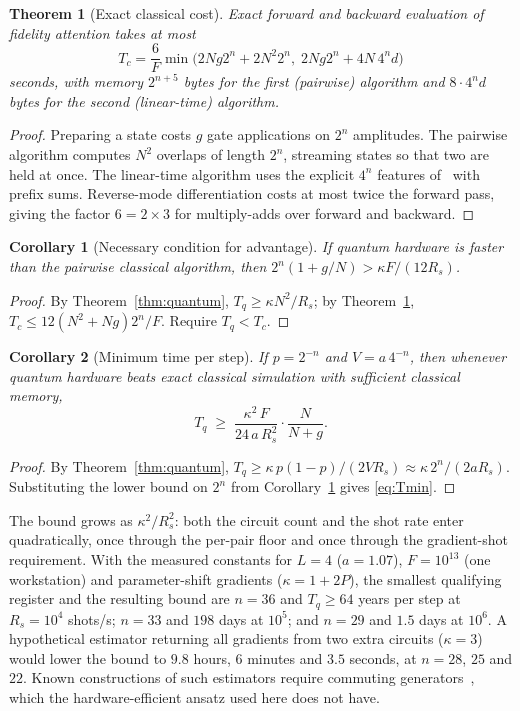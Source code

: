 \documentclass[conference]{IEEEtran}
\newtheorem{theorem}{Theorem}
\newtheorem{corollary}{Corollary}
\theoremstyle{definition}
\begin{document}
\begin{theorem}[Exact classical cost]\label{thm:classical}
Exact forward and backward evaluation of fidelity attention takes at most
\begin{equation}
T_c=\frac{6}{F}\min\!\big(2Ng2^n+2N^2 2^n,\;2Ng2^n+4N\,4^n d\big)
\label{eq:Tc}
\end{equation}
seconds, with memory $2^{n+5}$ bytes for the first (pairwise) algorithm and $8\cdot4^n d$ bytes for the second (linear-time) algorithm.
\end{theorem}
\begin{proof}
Preparing a state costs $g$ gate applications on $2^n$ amplitudes. The pairwise algorithm computes $N^2$ overlaps of length $2^n$, streaming states so that two are held at once. The linear-time algorithm uses the explicit $4^n$ features of~\cite{singuru2026fidelity} with prefix sums. Reverse-mode differentiation costs at most twice the forward pass, giving the factor $6=2\times3$ for multiply-adds over forward and backward.
\end{proof}

\begin{corollary}[Necessary condition for advantage]\label{cor:cond}
If quantum hardware is faster than the pairwise classical algorithm, then $2^n(1+g/N)>\kappa F/(12R_s)$.
\end{corollary}
\begin{proof}
By Theorem~\ref{thm:quantum}, $T_q\ge\kappa N^2/R_s$; by Theorem~\ref{thm:classical}, $T_c\le12(N^2+Ng)2^n/F$. Require $T_q<T_c$.
\end{proof}

\begin{corollary}[Minimum time per step]\label{cor:time}
If $p=2^{-n}$ and $V=a\,4^{-n}$, then whenever quantum hardware beats exact classical simulation with sufficient classical memory,
\begin{equation}
T_q\;\ge\;\frac{\kappa^2\,F}{24\,a\,R_s^{2}}\cdot\frac{N}{N+g}.
\label{eq:Tmin}
\end{equation}
\end{corollary}
\begin{proof}
By Theorem~\ref{thm:quantum}, $T_q\ge\kappa\,p(1-p)/(2VR_s)\approx\kappa\,2^n/(2aR_s)$. Substituting the lower bound on $2^n$ from Corollary~\ref{cor:cond} gives \eqref{eq:Tmin}.
\end{proof}

\noindent The bound grows as $\kappa^2/R_s^2$: both the circuit count and the shot rate enter quadratically, once through the per-pair floor and once through the gradient-shot requirement. With the measured constants for $L=4$ ($a=1.07$), $F=10^{13}$ (one workstation) and parameter-shift gradients ($\kappa=1+2P$), the smallest qualifying register and the resulting bound are $n=36$ and $T_q\ge 64$ years per step at $R_s=10^4$ shots/s; $n=33$ and $198$ days at $10^5$; and $n=29$ and $1.5$ days at $10^6$. A hypothetical estimator returning all gradients from two extra circuits ($\kappa=3$) would lower the bound to $9.8$ hours, $6$ minutes and $3.5$ seconds, at $n=28$, $25$ and $22$. Known constructions of such estimators require commuting generators~\cite{bowles2025backprop}, which the hardware-efficient ansatz used here does not have.
\end{document}
